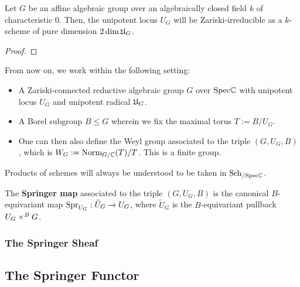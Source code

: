            \begin{proposition}
                Let $G$ be an affine algebraic group over an algebraically closed field $k$ of characteristic $0$. Then, the unipotent locus $U_G$ will be Zariski-irreducible as a $k$-scheme of pure dimension $2\dim \mathfrak{U}_G$.
            \end{proposition}
                \begin{proof}
                    
                \end{proof}
            
            \begin{convention}
                From now on, we work within the following setting:
                    \begin{itemize}
                        \item A Zariski-connected reductive algebraic group $G$ over $\mathrm{Spec} \mathbb{C}$ with unipotent locus $U_G$ and unipotent radical $\mathfrak{U}_G$.
                        \item A Borel subgroup $B \leq G$ wherein we fix the maximal torus $T := B/U_G$.
                        \item One can then also define the Weyl group associated to the triple $(G, U_G, B)$, which is $W_G := \mathrm{Norm}_{G/\mathbb{C}}(T)/T$. This is a finite group. 
                    \end{itemize}
            \end{convention}
            \begin{convention}
                Products of schemes will always be understood to be taken in $\mathrm{Sch}_{/\mathrm{Spec} \mathbb{C}}$.
            \end{convention}
            
            \begin{definition} \label{def: springer_map}
                The \textbf{Springer map} associated to the triple $(G, U_G, B)$ is the canonical $B$-equivariant map $\mathrm{Spr}_{U_G}: \tilde{U}_G \to U_G$, where $\tilde{U}_G$ is the $B$-equivariant pullback $U_G \x^B G$.
            \end{definition}
        
        \subsubsection{The Springer Sheaf}
    
    \subsection{The Springer Functor}